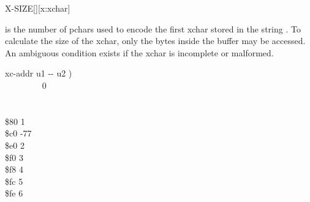 \begin{worddef*}{}{X-SIZE}[][x:xchar]
\item {}

	 is the number of pchars used to encode the first xchar
	stored in the string .  To calculate the size of
	the xchar, only the bytes inside the buffer may be accessed.  An
	ambiguous condition exists if the xchar is incomplete or malformed.

	\begin{implement}
	\word{:}   xc-addr u1 -{}- u2 ) \\
	\tab {} ~~~~~~~~  0   \\
	\tab {}  \\
	\tab {} \\
	\tab {} \$80    1   \\
	\tab {} \$c0   -77  ~~ \\
	\tab {} \$e0    2   \\
	\tab {} \$f0    3   \\
	\tab {} \$f8    4   \\
	\tab {} \$fc    5   \\
	\tab {} \$fe    6   \\
	  \word{;}
	\end{implement}
\end{worddef*}


